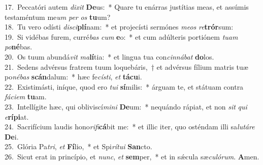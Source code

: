 {17.~}Peccatóri autem \textit{di}\textit{xit} \textbf{De}us:~* Quare tu enárras justítias meas, et assúmis testaméntum me\textit{um} \textit{per} \textit{os} \textbf{tu}um?\\
{18.~}Tu vero odísti \textit{di}\textit{sci}\textbf{plí}nam:~* et projecísti sermónes \textit{me}\textit{os} \textit{re}\textbf{trór}sum:\\
{19.~}Si vidébas furem, curré\textit{bas} \textit{cum} \textbf{e}o:~* et cum adúlteris portiónem \textit{tu}\textit{am} \textit{po}\textbf{né}bas.\\
{20.~}Os tuum abundá\textit{vit} \textit{ma}\textbf{lí}tia:~* et lingua tua con\textit{cin}\textit{ná}\textit{bat} \textbf{do}los.\\
{21.~}Sedens advérsus fratrem tuum loquebáris,~† et advérsus fílium matris tuæ po\textit{né}\textit{bas} \textbf{scán}dalum:~* hæc fe\textit{cí}\textit{sti}, \textit{et} \textbf{tá}\textbf{cu}i.\\
{22.~}Existimásti, iníque, quod ero \textit{tu}\textit{i} \textbf{sí}milis:~* árguam te, et státuam contra \textit{fá}\textit{ci}\textit{em} \textbf{tu}am.\\
{23.~}Intellígite hæc, qui obliviscí\textit{mi}\textit{ni} \textbf{De}um:~* nequándo rápiat, et non \textit{sit} \textit{qui} \textit{e}\textbf{rí}\textbf{pi}at.\\
{24.~}Sacrifícium laudis hono\textit{ri}\textit{fi}\textbf{cá}bit me:~* et illic iter, quo osténdam illi sa\textit{lu}\textit{tá}\textit{re} \textbf{De}i.\\
{25.~}Glória Pa\textit{tri}, \textit{et} \textbf{Fí}lio,~* et Spi\textit{rí}\textit{tu}\textit{i} \textbf{San}cto.\\
{26.~}Sicut erat in princípio, et \textit{nunc}, \textit{et} \textbf{sem}per,~* et in sǽcula sæ\textit{cu}\textit{ló}\textit{rum}. \textbf{A}men.\\
